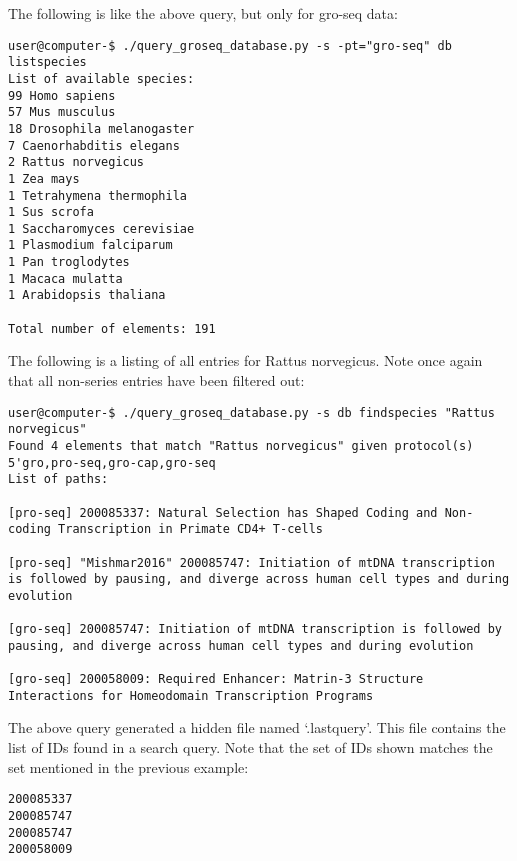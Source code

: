 \documentclass[12pt,letterpaper]{article}
\begin{document}
The following is like the above query, but only for gro-seq data:
\begin{verbatim}
user@computer-$ ./query_groseq_database.py -s -pt="gro-seq" db listspecies
List of available species:
99 Homo sapiens
57 Mus musculus
18 Drosophila melanogaster
7 Caenorhabditis elegans
2 Rattus norvegicus
1 Zea mays
1 Tetrahymena thermophila
1 Sus scrofa
1 Saccharomyces cerevisiae
1 Plasmodium falciparum
1 Pan troglodytes
1 Macaca mulatta
1 Arabidopsis thaliana

Total number of elements: 191
\end{verbatim}

The following is a listing of all entries for Rattus norvegicus. Note once again
that all non-series entries have been filtered out:
\begin{verbatim}
user@computer-$ ./query_groseq_database.py -s db findspecies "Rattus norvegicus"
Found 4 elements that match "Rattus norvegicus" given protocol(s) 5'gro,pro-seq,gro-cap,gro-seq
List of paths:

[pro-seq] 200085337: Natural Selection has Shaped Coding and Non-coding Transcription in Primate CD4+ T-cells

[pro-seq] "Mishmar2016" 200085747: Initiation of mtDNA transcription is followed by pausing, and diverge across human cell types and during evolution

[gro-seq] 200085747: Initiation of mtDNA transcription is followed by pausing, and diverge across human cell types and during evolution

[gro-seq] 200058009: Required Enhancer: Matrin-3 Structure Interactions for Homeodomain Transcription Programs
\end{verbatim}

The above query generated a hidden file named `.lastquery'. This file contains the list of IDs found in a search query. Note that the set
of IDs shown matches the set mentioned in the previous example:
\begin{verbatim}
200085337
200085747
200085747
200058009
\end{verbatim}
\end{document}
